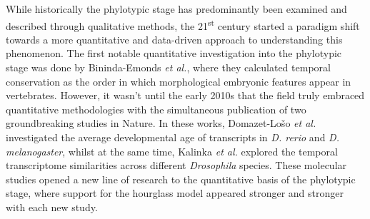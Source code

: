 While historically the phylotypic stage has predominantly been examined and described through qualitative methods, the 21\textsuperscript{st} century started a paradigm shift towards a more quantitative and data-driven approach to understanding this phenomenon\cite{Chan2021}. The first notable quantitative investigation into the phylotypic stage was done by Bininda-Emonds \textit{et al.}, where they calculated temporal conservation as the order in which morphological embryonic features appear in vertebrates\cite{OlafRP2003}. However, it wasn't until the early 2010s that the field truly embraced quantitative methodologies with the simultaneous publication of two groundbreaking studies in Nature\cite{Kalinka2010, DomazetLoso2010}. In these works, Domazet-Lošo \textit{et al.} investigated the average developmental age of transcripts in \textit{D. rerio} and \textit{D. melanogaster}, whilst at the same time, Kalinka \textit{et al.} explored the temporal transcriptome similarities across different \textit{Drosophila} species. These molecular studies opened a new line of research to the quantitative basis of the phylotypic stage, where support for the hourglass model appeared stronger and stronger with each new study.

